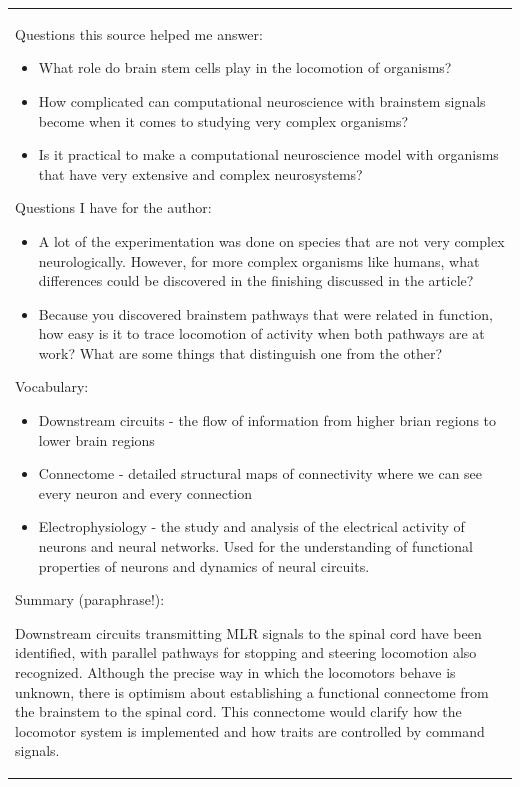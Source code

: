 \begin{longtable}[]{@{}
  >{\raggedright\arraybackslash}p{}@{}}
Questions this source helped me answer:

\begin{itemize}
\item
  What role do brain stem cells play in the locomotion of organisms?
\item
  How complicated can computational neuroscience with brainstem signals
  become when it comes to studying very complex organisms?
\item
  Is it practical to make a computational neuroscience model with
  organisms that have very extensive and complex neurosystems?
\end{itemize}


Questions I have for the author:

\begin{itemize}
\item
  A lot of the experimentation was done on species that are not very
  complex neurologically. However, for more complex organisms like
  humans, what differences could be discovered in the finishing
  discussed in the article?
\item
  Because you discovered brainstem pathways that were related in
  function, how easy is it to trace locomotion of activity when both
  pathways are at work? What are some things that distinguish one from
  the other?
\end{itemize}


Vocabulary:

\begin{itemize}
\item
  Downstream circuits - the flow of information from higher brian
  regions to lower brain regions
\item
  Connectome - detailed structural maps of connectivity where we can see
  every neuron and every connection
\item
  Electrophysiology - the study and analysis of the electrical activity
  of neurons and neural networks. Used for the understanding of
  functional properties of neurons and dynamics of neural circuits.
\end{itemize}


Summary (paraphrase!):

Downstream circuits transmitting MLR signals to the spinal cord have
been identified, with parallel pathways for stopping and steering
locomotion also recognized. Although the precise way in which the
locomotors behave is unknown, there is optimism about establishing a
functional connectome from the brainstem to the spinal cord. This
connectome would clarify how the locomotor system is implemented and how
traits are controlled by command signals.



\end{longtable}
